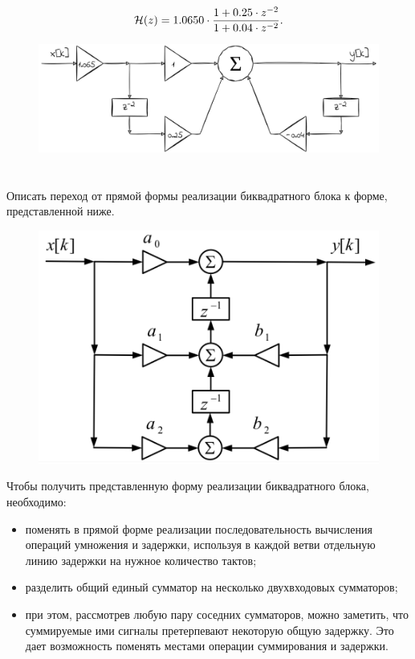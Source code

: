 \begin{equation*}
	\mathcal{H}(z) =  1.0650 \cdot \dfrac{1 + 0.25\cdot z^{-2}}{1 + 0.04\cdot z^{-2}}.
\end{equation*}

\begin{figure}[!h]
	\centering
	\includegraphics[width=1.0\columnwidth]{pics/fall/10/10-4.png}
	\label{fig:10-4}
\end{figure}

\section{}
Описать переход от прямой формы реализации биквадратного блока к форме, представленной ниже.

\begin{figure}[!h]
	\centering
	\includegraphics[width=0.6\columnwidth]{pics/fall/10/10-5.png}
	\label{fig:10-5}
\end{figure}

Чтобы получить представленную форму реализации биквадратного блока, необходимо:

\begin{itemize}
	\item поменять в прямой форме реализации последовательность вычисления операций умножения и задержки, используя в каждой ветви отдельную линию задержки на нужное количество тактов; 
	\item разделить общий единый сумматор на несколько двухвходовых сумматоров;
	\item при этом, рассмотрев любую пару соседних сумматоров, можно заметить, что
	суммируемые ими сигналы претерпевают некоторую общую задержку. Это дает возможность поменять местами операции суммирования и задержки.
	
\end{itemize}

